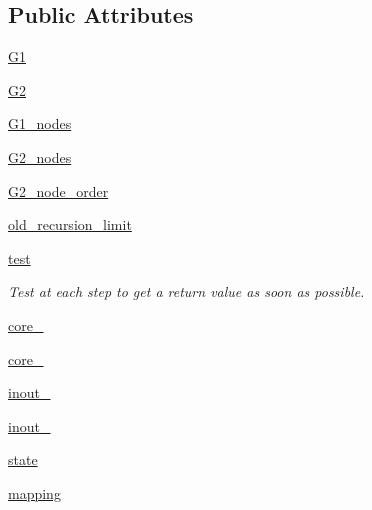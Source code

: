 \subsection*{Public Attributes}
\begin{DoxyCompactItemize}
\item 
\hyperlink{classnetworkx_1_1algorithms_1_1isomorphism_1_1isomorphvf2_1_1GraphMatcher_a7a5a2c6d9d4bc47ea16dd8392c2c2e17}{G1}
\item 
\hyperlink{classnetworkx_1_1algorithms_1_1isomorphism_1_1isomorphvf2_1_1GraphMatcher_a0513325f608a0a7357d0b43111e233ec}{G2}
\item 
\hyperlink{classnetworkx_1_1algorithms_1_1isomorphism_1_1isomorphvf2_1_1GraphMatcher_a0344887a422d6c9c9082e9dd28266660}{G1\+\_\+nodes}
\item 
\hyperlink{classnetworkx_1_1algorithms_1_1isomorphism_1_1isomorphvf2_1_1GraphMatcher_accd4cc031f1c4c946ced5eeaaa5142f7}{G2\+\_\+nodes}
\item 
\hyperlink{classnetworkx_1_1algorithms_1_1isomorphism_1_1isomorphvf2_1_1GraphMatcher_a3d56304505702b174f133813220cdc93}{G2\+\_\+node\+\_\+order}
\item 
\hyperlink{classnetworkx_1_1algorithms_1_1isomorphism_1_1isomorphvf2_1_1GraphMatcher_ac6fe9e3c57de9485b7bb2cacf6add161}{old\+\_\+recursion\+\_\+limit}
\item 
\hyperlink{classnetworkx_1_1algorithms_1_1isomorphism_1_1isomorphvf2_1_1GraphMatcher_a811bc286340c2426f05c475441819d8b}{test}
\begin{DoxyCompactList}\small\item\em Test at each step to get a return value as soon as possible. \end{DoxyCompactList}\item 
\hyperlink{classnetworkx_1_1algorithms_1_1isomorphism_1_1isomorphvf2_1_1GraphMatcher_ad3e55bc9fa84b116c81ae1e0b2434554}{core\+\_}
\item 
\hyperlink{classnetworkx_1_1algorithms_1_1isomorphism_1_1isomorphvf2_1_1GraphMatcher_ab373363db0399019c0f086fa09c783f5}{core\+\_}
\item 
\hyperlink{classnetworkx_1_1algorithms_1_1isomorphism_1_1isomorphvf2_1_1GraphMatcher_a3f158162140650ec243707f9696e3dbe}{inout\+\_}
\item 
\hyperlink{classnetworkx_1_1algorithms_1_1isomorphism_1_1isomorphvf2_1_1GraphMatcher_a6686d473f54089152bfa5479d061cee2}{inout\+\_}
\item 
\hyperlink{classnetworkx_1_1algorithms_1_1isomorphism_1_1isomorphvf2_1_1GraphMatcher_aaae1887046e9306c220b9849f613e6b0}{state}
\item 
\hyperlink{classnetworkx_1_1algorithms_1_1isomorphism_1_1isomorphvf2_1_1GraphMatcher_a793e95dfe3dca29518e9f2551090e0cf}{mapping}
\end{DoxyCompactItemize}


